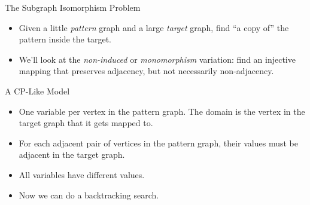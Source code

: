 \documentclass{beamer}
\begin{document}
\begin{frame}{The Subgraph Isomorphism Problem}

    \begin{itemize}
        \item Given a little \emph{pattern} graph and a large \emph{target} graph, find ``a copy
            of'' the pattern inside the target.

        \item We'll look at the \emph{non-induced} or \emph{monomorphism} variation: find an
            injective mapping that preserves adjacency, but not necessarily non-adjacency.
    \end{itemize}

    \vspace{1em}

    \centering

\end{frame}

\begin{frame}{A CP-Like Model}

    \begin{itemize}
        \item One variable per vertex in the pattern graph. The domain is the vertex in the target
            graph that it gets mapped to.

        \item For each adjacent pair of vertices in the pattern graph, their values must be adjacent
            in the target graph.

        \item All variables have different values.

        \item Now we can do a backtracking search.
    \end{itemize}

\end{frame}
\end{document}
